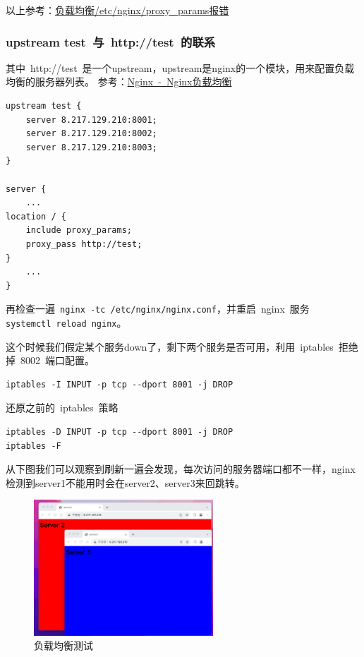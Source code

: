 \documentclass[12pt, a4paper]{article} %
\begin{document}
\begin{CJK*}{UTF8}{gbsn}
以上参考：\href{https://www.jianshu.com/p/0e0cf88da24e}{负载均衡/etc/nginx/proxy\_params报错}

\subsubsection{upstream test~与~http://test~的联系}

其中~http://test~是一个upstream，upstream是nginx的一个模块，用来配置负载均衡的服务器列表。 参考：\href{https://blog.csdn.net/weixin_44623055/article/details/124715177}{Nginx~-~Nginx负载均衡}

\begin{lstlisting}
upstream test {
    server 8.217.129.210:8001;
    server 8.217.129.210:8002;
    server 8.217.129.210:8003;
}

server {
    ...
location / {
    include proxy_params;
    proxy_pass http://test;
}
    ...
}
\end{lstlisting}

\clearpage
再检查一遍~\verb|nginx -tc /etc/nginx/nginx.conf|，并重启~nginx~服务 \\ \verb|systemctl reload nginx|。

这个时候我们假定某个服务down了，剩下两个服务是否可用，利用~iptables~拒绝掉~8002~端口配置。
\begin{lstlisting}
iptables -I INPUT -p tcp --dport 8001 -j DROP
\end{lstlisting}
还原之前的~iptables~策略
\begin{lstlisting}
iptables -D INPUT -p tcp --dport 8001 -j DROP
iptables -F
\end{lstlisting}

从下图我们可以观察到刷新一遍会发现，每次访问的服务器端口都不一样，nginx检测到server1不能用时会在server2、server3来回跳转。

\begin{figure}[htbp]
    \centering
    \includegraphics[width=0.6\textwidth]{./imgs/catch2023-08-26-12.39.02.png}
    \caption{负载均衡测试}
\end{figure}


\end{CJK*}
\end{document}
